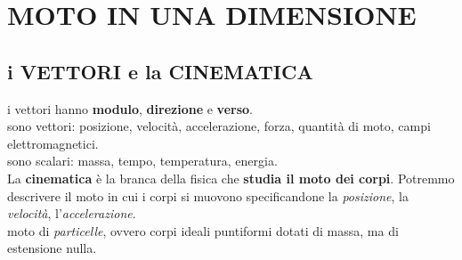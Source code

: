 \documentclass{article}
\begin{document}
	\section{MOTO IN UNA DIMENSIONE}
		\subsection{i VETTORI e la CINEMATICA}
			i vettori hanno \textbf{modulo}, \textbf{direzione} e \textbf{verso}. \\
			sono vettori: posizione, velocità, accelerazione, forza, quantità di moto, campi elettromagnetici. \\
			sono scalari: massa, tempo, temperatura, energia. \\
			La \textbf{cinematica} è la branca della fisica che \textbf{studia il moto dei corpi}.
			Potremmo descrivere il moto in cui i corpi si muovono specificandone la \textit{posizione}, la \textit{velocità}, l'\textit{accelerazione}. \\
			moto di \textit{particelle}, ovvero corpi ideali puntiformi dotati di massa, ma di estensione nulla.
		
\end{document}
